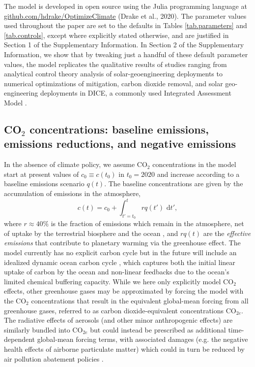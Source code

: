 \documentclass{article}
\begin{document}
The model is developed in open source using the Julia programming language \citep{bezanson_julia:_2017} at \url{github.com/hdrake/OptimizeClimate} (Drake et al., 2020). The parameter values used throughout the paper are set to the defaults in Tables \ref{tab.parameters} and \ref{tab.controls}, except where explicitly stated otherwise, and are justified in Section 1 of the Supplementary Information. In Section 2 of the Supplementary Information, we show that by tweaking just a handful of these default parameter values, the model replicates the qualitative results of studies ranging from analytical control theory analysis of solar-geoengineering deployments \citep{soldatenko_optimal_2018} to numerical optimizations of mitigation, carbon dioxide removal, and solar geo-engineering deployments in DICE, a commonly used Integrated Assessment Model \citep{belaia_optimal_2019}.

\subsection{CO$_{2}$ concentrations: baseline emissions, emissions reductions, and negative emissions}

In the absence of climate policy, we assume CO$_{2}$ concentrations in the model start at present values of $c_{0} \equiv c(t_{0})$ in $t_{0}=2020$ and increase according to a baseline emissions scenario $q(t)$. The baseline concentrations are given by the accumulation of emissions in the atmosphere,
\begin{equation}
c(t) = c_{0} + \int_{t'=t_{0}}^{t} rq(t') \text{ d}t',
\end{equation}
where $r \approx 40\%$ is the fraction of emissions which remain in the atmosphere, net of uptake by the terrestrial biosphere and the ocean \citep{solomon_irreversible_2009}, and $rq(t)$ are the \textit{effective emissions} that contribute to planetary warming via the greenhouse effect. The model currently has no explicit carbon cycle but in the future will include an idealized dynamic ocean carbon cycle \citep[e.g.][]{glotter_simple_2014}, which captures both the initial linear uptake of carbon by the ocean and non-linear feedbacks due to the ocean's limited chemical buffering capacity. While we here only explicitly model CO$_{2}$ effects, other greenhouse gases may be approximated by forcing the model with the CO$_{2}$ concentrations that result in the equivalent global-mean forcing from all greenhouse gases, referred to as carbon dioxide-equivalent concentrations CO$_{2e}$. The radiative effects of aerosols (and other minor anthropogenic effects) are similarly bundled into CO$_{2e}$ but could instead be prescribed as additional time-dependent global-mean forcing terms, with associated damages (e.g. the negative health effects of airborne particulate matter) which could in turn be reduced by air pollution abatement policies \citep{thompson_systems_2014}.
\end{document}
